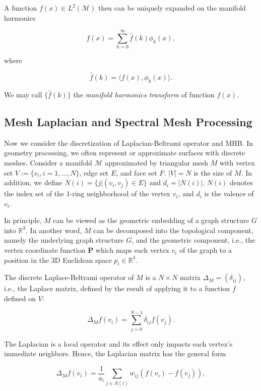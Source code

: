 A function $f(x)\in L^2(\mathcal{M})$ then can be uniquely expanded on the manifold harmonics

\begin{equation}\label{eq:ift}
f(x)=\sum_{k=0}^\infty\hat{f}(k)\phi_k(x),
\end{equation}

where

\begin{equation}
\hat{f}(k)=\langle f(x),\phi_k(x)\rangle.
\end{equation}

We may call $\{\hat{f}(k)\}$ the \emph{manifold harmonics transform} of function $f(x)$.

\subsection{Mesh Laplacian and Spectral Mesh Processing}
Now we consider the discretization of Laplacian-Beltrami operator and MHB.
In geometry processing, we often represent or approximate surfaces with discrete
meshes. Consider a manifold $\mathcal{M}$ approximated by triangular mesh $M$ with vertex
set $V:=\{v_i, i=1,\ldots,N\}$, edge set $E$, and face set $F$. $|V|=N$ is the size
of $M$. In addition, we define $N(i)=\{j|(v_i,v_j)\in E\}$ and $d_i=|N(i)|$. $N(i)$
denotes the index set of the 1-ring neighborhood of the vertex $v_i$, and $d_i$ is
the valence of $v_i$.

In principle, $M$ can be viewed as the geometric embedding of a graph structure
$G$ into $\mathbb{R}^3$. In another word, $M$ can be decomposed into the
topological component, namely the underlying graph structure $G$, and the geometric
component, i.e., the vertex coordinate function $\mathbf{P}$ which maps each vertex
$v_i$ of the graph to a position in the 3D Euclidean space $p_i\in\mathbb{R}^3$.

The discrete Laplace-Beltrami operator of $M$ is a $N\times N$ matrix
$\Delta_M=(\delta_{ij})$, i.e., the Laplace matrix, defined by the result of
applying it to a function $f$ defined on $V$:

\begin{equation}
\Delta_M f(v_i)=\sum_{j=0}^{N-1}\delta_{ij}f(v_j).
\end{equation}

The Laplacian is a local operator and its effect only impacts each vertex's immediate
neighbors. Hence, the Laplacian matrix has the general form

\begin{equation}
  \Delta_M f(v_i)=\frac{1}{a_i}\sum_{j\in N(i)} w_{ij}(f(v_i)-f(v_j)),
\end{equation}

